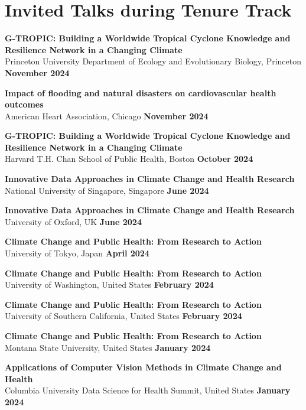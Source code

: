 \section*{Invited Talks during Tenure Track}

\noindent \textbf{G-TROPIC: Building a Worldwide Tropical Cyclone Knowledge and Resilience Network in a Changing Climate} \\Princeton University Department of Ecology and Evolutionary Biology, Princeton \hfill \textbf{November 2024} \medskip

\noindent \textbf{Impact of flooding and natural disasters on cardiovascular health outcomes} \\American Heart Association, Chicago \hfill \textbf{November 2024} \medskip

\noindent \textbf{G-TROPIC: Building a Worldwide Tropical Cyclone Knowledge and Resilience Network in a Changing Climate} \\Harvard T.H. Chan School of Public Health, Boston \hfill \textbf{October 2024} \medskip

\noindent \textbf{Innovative Data Approaches in Climate Change and Health Research} \\National University of Singapore, Singapore \hfill \textbf{June 2024} \medskip

\noindent \textbf{Innovative Data Approaches in Climate Change and Health Research} \\University of Oxford, UK \hfill \textbf{June 2024} \medskip

\noindent \textbf{Climate Change and Public Health: From Research to Action} \\University of Tokyo, Japan \hfill \textbf{April 2024} \medskip

\noindent \textbf{Climate Change and Public Health: From Research to Action} \\University of Washington, United States \hfill \textbf{February 2024} \medskip

\noindent \textbf{Climate Change and Public Health: From Research to Action} \\University of Southern California, United States \hfill \textbf{February 2024} \medskip

\noindent \textbf{Climate Change and Public Health: From Research to Action} \\Montana State University, United States \hfill \textbf{January 2024} \medskip

\noindent \textbf{Applications of Computer Vision Methods in Climate Change and Health} \\Columbia University Data Science for Health Summit, United States \hfill \textbf{January 2024} \medskip


